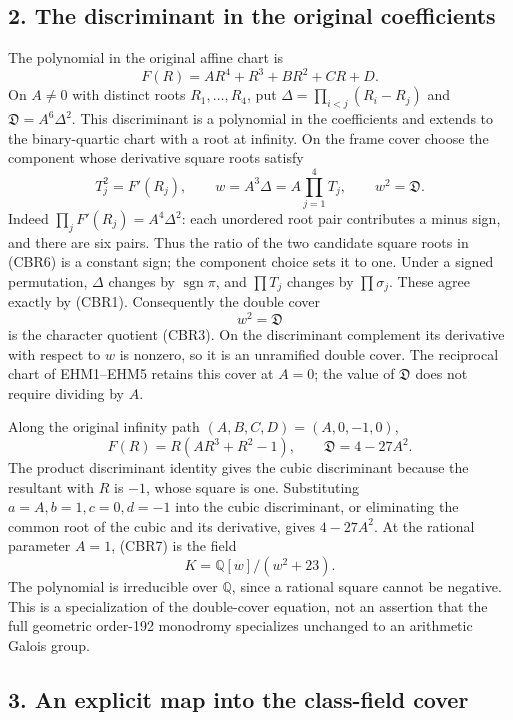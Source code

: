 \documentclass[
  10pt,
  a4paper,
]{article}
\begin{document}
\subsection{2. The discriminant in the original
coefficients}\label{the-discriminant-in-the-original-coefficients}

The polynomial in the original affine chart is \[
F(R)=AR^4+R^3+BR^2+CR+D.
\tag{CBR5}
\] On \(A\ne0\) with distinct roots \(R_1,\ldots,R_4\), put
\(\Delta=\prod_{i<j}(R_i-R_j)\) and \(\mathfrak D=A^6\Delta^2\). This
discriminant is a polynomial in the coefficients and extends to the
binary-quartic chart with a root at infinity. On the frame cover choose
the component whose derivative square roots satisfy \[
T_j^2=F'(R_j),\qquad
w=A^3\Delta=A\prod_{j=1}^4T_j,\qquad w^2=\mathfrak D.
\tag{CBR6}
\] Indeed \(\prod_jF'(R_j)=A^4\Delta^2\): each unordered root pair
contributes a minus sign, and there are six pairs. Thus the ratio of the
two candidate square roots in (CBR6) is a constant sign; the component
choice sets it to one. Under a signed permutation, \(\Delta\) changes by
\(\operatorname{sgn}\pi\), and \(\prod T_j\) changes by
\(\prod\sigma_j\). These agree exactly by (CBR1). Consequently the
double cover \[
w^2=\mathfrak D
\tag{CBR7}
\] is the character quotient (CBR3). On the discriminant complement its
derivative with respect to \(w\) is nonzero, so it is an unramified
double cover. The reciprocal chart of EHM1--EHM5 retains this cover at
\(A=0\); the value of \(\mathfrak D\) does not require dividing by
\(A\).

Along the original infinity path \((A,B,C,D)=(A,0,-1,0)\), \[
F(R)=R(AR^3+R^2-1),\qquad
\mathfrak D=4-27A^2.
\tag{CBR8}
\] The product discriminant identity gives the cubic discriminant
because the resultant with \(R\) is \(-1\), whose square is one.
Substituting \(a=A,b=1,c=0,d=-1\) into the cubic discriminant, or
eliminating the common root of the cubic and its derivative, gives
\(4-27A^2\). At the rational parameter \(A=1\), (CBR7) is the field \[
K=\mathbb Q[w]/(w^2+23).
\tag{CBR9}
\] The polynomial is irreducible over \(\mathbb Q\), since a rational
square cannot be negative. This is a specialization of the double-cover
equation, not an assertion that the full geometric order-192 monodromy
specializes unchanged to an arithmetic Galois group.

\subsection{3. An explicit map into the class-field
cover}\label{an-explicit-map-into-the-class-field-cover}
\end{document}
